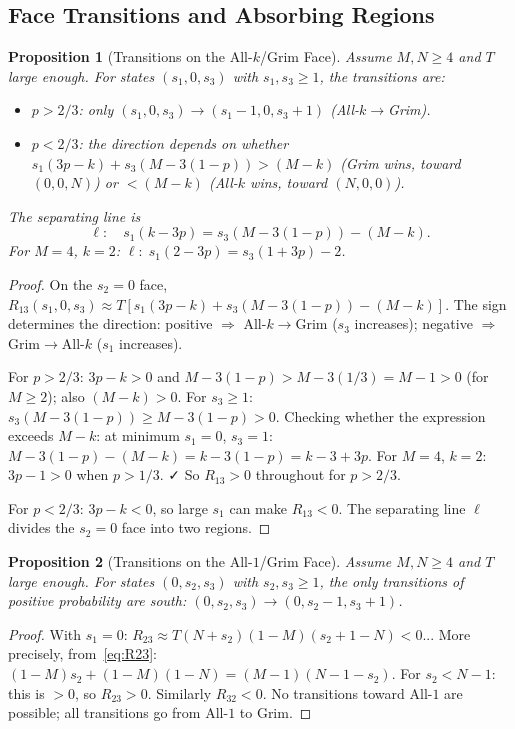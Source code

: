 \documentclass[12pt,a4paper]{article}
\newtheorem{proposition}{Proposition}[section]
\begin{document}
\subsection{Face Transitions and Absorbing Regions}

\begin{proposition}[Transitions on the All-$k$/Grim Face]\label{prop:face13}
Assume $M,N\geq 4$ and $T$ large enough.
For states $(s_1,0,s_3)$ with $s_1,s_3\geq 1$, the transitions are:
\begin{itemize}
  \item $p>2/3$: only $(s_1,0,s_3)\to(s_1-1,0,s_3+1)$ (All-$k\to$Grim).
  \item $p<2/3$: the direction depends on whether
        $s_1(3p-k)+s_3(M-3(1-p))>(M-k)$ (Grim wins, toward $(0,0,N)$) or
        $<(M-k)$ (All-$k$ wins, toward $(N,0,0)$).
\end{itemize}
The separating line is
\[
  \ell: \quad s_1(k-3p) = s_3(M-3(1-p)) - (M-k).
\]
For $M=4$, $k=2$: $\ell:\; s_1(2-3p)=s_3(1+3p)-2$.
\end{proposition}

\begin{proof}
On the $s_2=0$ face, $R_{13}(s_1,0,s_3)\approx T[s_1(3p-k)+s_3(M-3(1-p))-(M-k)]$.
The sign determines the direction:
positive $\Rightarrow$ All-$k\to$Grim ($s_3$ increases); negative $\Rightarrow$ Grim$\to$All-$k$ ($s_1$ increases).

For $p>2/3$: $3p-k>0$ and $M-3(1-p)>M-3(1/3)=M-1>0$ (for $M\geq 2$); also
$(M-k)>0$. For $s_3\geq 1$: $s_3(M-3(1-p))\geq M-3(1-p)>0$. Checking
whether the expression exceeds $M-k$: at minimum $s_1=0$, $s_3=1$:
$M-3(1-p)-(M-k)=k-3(1-p)=k-3+3p$. For $M=4$, $k=2$: $3p-1>0$ when $p>1/3$. ✓
So $R_{13}>0$ throughout for $p>2/3$.

For $p<2/3$: $3p-k<0$, so large $s_1$ can make $R_{13}<0$.
The separating line $\ell$ divides the $s_2=0$ face into two regions.
\end{proof}

\begin{proposition}[Transitions on the All-$1$/Grim Face]\label{prop:face23}
Assume $M,N\geq 4$ and $T$ large enough. For states $(0,s_2,s_3)$ with
$s_2,s_3\geq 1$, the only transitions of positive probability are south:
$(0,s_2,s_3)\to(0,s_2-1,s_3+1)$.
\end{proposition}

\begin{proof}
With $s_1=0$: $R_{23}\approx T(N+s_2)(1-M)(s_2+1-N)<0$... More precisely,
from~\eqref{eq:R23}: $(1-M)s_2+(1-M)(1-N)=(M-1)(N-1-s_2)$.
For $s_2<N-1$: this is $>0$, so $R_{23}>0$. Similarly $R_{32}<0$.
No transitions toward All-$1$ are possible; all transitions go from All-$1$ to Grim.
\end{proof}
\end{document}
